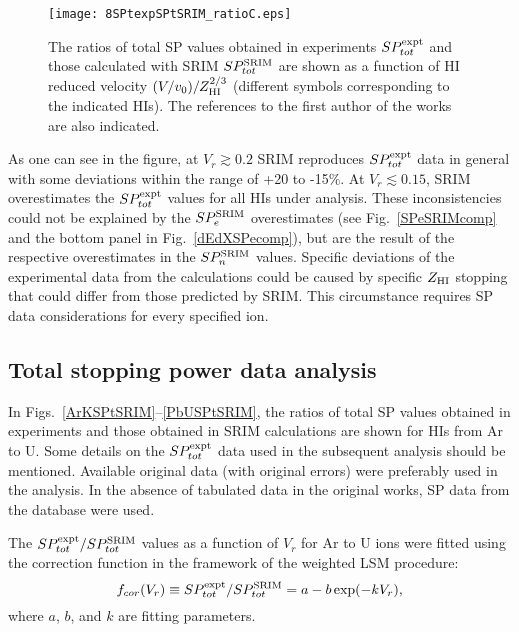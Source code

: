 \documentclass[aps,pra,twocolumn,amsmath,amssymb,floatfix]{revtex4-2}
\begin{document}
\begin{figure}[!h]  %
\begin{center}
\texttt{[image: 8SPtexpSPtSRIM\_ratioC.eps]}
\caption{\label{SPtallSRIM}The ratios of total SP values obtained in experiments $SP_{tot}^{\rm expt}$ \cite{SRIM,IAEASP} and those calculated with SRIM $SP_{tot}^{\rm SRIM}$ \cite{SRIM} are shown as a function of HI reduced velocity $(V/v_{0}) / Z^{2/3}_{\rm HI}$ (different symbols corresponding to the indicated HIs). The references to the first author of the works are also indicated.}
\end{center}
\end{figure}

As one can see in the figure, at $V_{r} \gtrsim 0.2$ SRIM reproduces $SP_{tot}^{\rm expt}$ data in general with some deviations within the range of +20 to -15\%. At $V_{r} \lesssim 0.15$, SRIM overestimates the $SP_{tot}^{\rm expt}$ values for all HIs under analysis. These inconsistencies could not be explained by the $SP_{e}^{\rm SRIM}$ overestimates (see Fig.~\ref{SPeSRIMcomp} and the bottom panel in Fig.~\ref{dEdXSPecomp}), but are the result of the respective overestimates in the $SP_{n}^{\rm SRIM}$ values. Specific deviations of the experimental data from the calculations could be caused by specific $Z_{\rm HI}$ stopping that could differ from those predicted by SRIM. This circumstance requires SP data considerations for every specified ion.


\subsection{\label{SPtotSRIM}Total stopping power data analysis}

In Figs.~\ref{ArKSPtSRIM}--\ref{PbUSPtSRIM}, the ratios of total SP values obtained in experiments and those obtained in SRIM calculations are shown for HIs from Ar to U. Some details on the $SP_{tot}^{\rm expt}$ data used in the subsequent analysis should be mentioned. Available original data (with original errors) were preferably used in the analysis. In the absence of tabulated data in the original works, SP data from the database \cite{IAEASP} were used.

The $SP_{tot}^{\rm expt}/SP_{tot}^{\rm SRIM}$ values as a function of $V_{r}$ for Ar to U ions were fitted using the correction function in the framework of the weighted LSM procedure:
\begin{equation}  \label{expfit}
 f_{cor}(V_{r}) \equiv SP_{tot}^{\rm expt}/SP_{tot}^{\rm SRIM} = a - b\exp(-k V_{r}),
\end{equation}
where $a$, $b$, and $k$ are fitting parameters.
\end{document}

